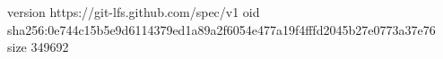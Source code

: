 version https://git-lfs.github.com/spec/v1
oid sha256:0e744c15b5e9d6114379ed1a89a2f6054e477a19f4fffd2045b27e0773a37e76
size 349692
